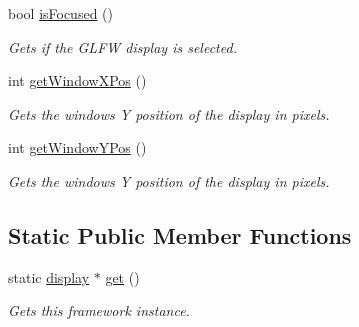 \begin{DoxyCompactItemize}
bool \hyperlink{classflounder_1_1display_a57dbf90706399fb0511b50740a1b77da}{is\+Focused} ()
\begin{DoxyCompactList}\small\item\em Gets if the G\+L\+FW display is selected. \end{DoxyCompactList}\item 
int \hyperlink{classflounder_1_1display_adbf55bdf135324664810751f3ab27d82}{get\+Window\+X\+Pos} ()
\begin{DoxyCompactList}\small\item\em Gets the windows Y position of the display in pixels. \end{DoxyCompactList}\item 
int \hyperlink{classflounder_1_1display_a92e7674dcd56f1e3f8b617a9b3fb625d}{get\+Window\+Y\+Pos} ()
\begin{DoxyCompactList}\small\item\em Gets the windows Y position of the display in pixels. \end{DoxyCompactList}\end{DoxyCompactItemize}
\subsection*{Static Public Member Functions}
\begin{DoxyCompactItemize}
\item 
static \hyperlink{classflounder_1_1display}{display} $\ast$ \hyperlink{classflounder_1_1display_a7c7015939f48bf4526bb0330ea4fcd2f}{get} ()
\begin{DoxyCompactList}\small\item\em Gets this framework instance. \end{DoxyCompactList}\end{DoxyCompactItemize}
